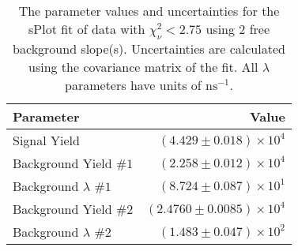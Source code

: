 
\begin{table}
    \begin{center}
        \begin{tabular}{lr}\toprule
            Parameter & Value \\\midrule
            Signal Yield & $(4.429 \pm 0.018) \times 10^{4}$ \\
            Background Yield $\#1$ & $(2.258 \pm 0.012) \times 10^{4}$ \\
            Background $\lambda$ $\#1$ & $(8.724 \pm 0.087) \times 10^{1}$ \\
            Background Yield $\#2$ & $(2.4760 \pm 0.0085) \times 10^{4}$ \\
            Background $\lambda$ $\#2$ & $(1.483 \pm 0.047) \times 10^{2}$ \\\bottomrule
        \end{tabular}
        \caption{The parameter values and uncertainties for the sPlot fit of data with $\chi^2_\nu < 2.75$ using 2 free background slope(s). Uncertainties are calculated using the covariance matrix of the fit. All $\lambda$ parameters have units of $\si{\nano\second}^{-1}$.}
    \end{center}
\end{table}
